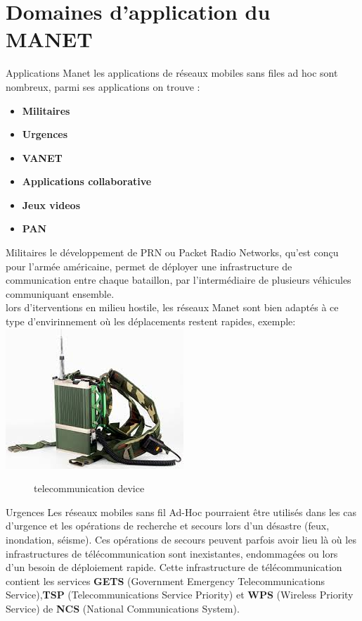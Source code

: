 \documentclass[11pt]{beamer}
\begin{document}
\section{Domaines d'application du MANET}
\begin{frame}{Applications Manet}
les applications de réseaux mobiles sans files ad hoc sont nombreux, parmi ses applications on trouve :\\
\begin{itemize}
\item \textbf{Militaires}
\item \textbf{Urgences}
\item \textbf{VANET}
\item \textbf{Applications collaborative}
\item \textbf{Jeux videos}
\item \textbf{PAN}
\end{itemize}
\end{frame}
\begin{frame}
\begin{exampleblock}{Militaires}
le développement de PRN ou Packet Radio Networks, qu'est conçu pour l’armée américaine, permet de déployer une infrastructure de communication entre chaque bataillon, par l’intermédiaire de plusieurs véhicules communiquant ensemble.\\
lors d'iterventions en milieu hostile, les réseaux Manet sont bien adaptés à ce type d'envirinnement où les déplacements restent rapides, exemple:\\
\centering
\includegraphics[scale=0.45]{img2.jpg}
\begin{figure}
\caption{telecommunication device}
\end{figure} 
\end{exampleblock}
\end{frame}
\begin{frame}
\begin{exampleblock}{Urgences}
Les réseaux mobiles sans fil Ad-Hoc pourraient être utilisés dans les cas d’urgence et les opérations de recherche et secours lors d’un désastre (feux, inondation, séisme). Ces
opérations de secours peuvent parfois avoir lieu là où les infrastructures de télécommunication sont inexistantes, endommagées ou lors d’un besoin de déploiement rapide.
Cette infrastructure de télécommunication contient les services \textbf{GETS} (Government
Emergency Telecommunications Service),\textbf{TSP} (Telecommunications Service
Priority) et \textbf{WPS} (Wireless Priority Service) de \textbf{NCS} (National Communications System).
\end{exampleblock}
\end{frame}
\end{document}
